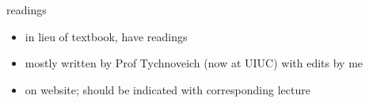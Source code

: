 \begin{frame}{readings}
    \begin{itemize}
    \item in lieu of textbook, have readings
    \item mostly written by Prof Tychnoveich (now at UIUC) with edits by me
    \vspace{.5cm}
    \item on website; should be indicated with corresponding lecture
    \end{itemize}
\end{frame}

